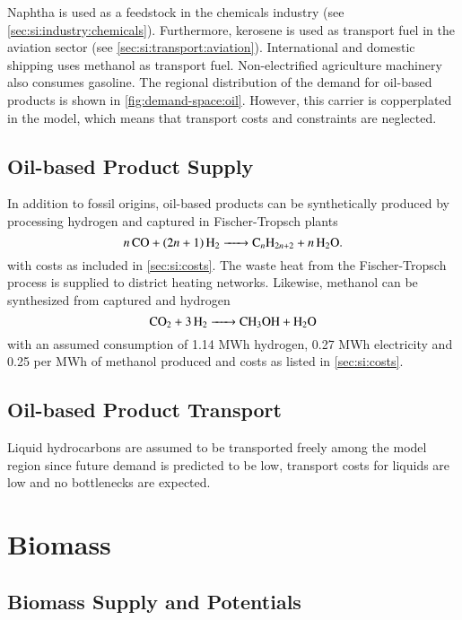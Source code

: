 Naphtha is used as a feedstock in the chemicals industry (see
\cref{sec:si:industry:chemicals}). Furthermore, kerosene is used as transport
fuel in the aviation sector (see \cref{sec:si:transport:aviation}). International
and domestic shipping uses methanol as transport fuel.
Non-electrified agriculture machinery also consumes gasoline. The regional
distribution of the demand for oil-based products is shown in
\cref{fig:demand-space:oil}. However, this carrier is copperplated in the model,
which means that transport costs and constraints are neglected.

\subsection{Oil-based Product Supply}
\label{sec:si:oil:supply}

In addition to fossil origins, oil-based products can be synthetically produced
by processing hydrogen and captured \co in Fischer-Tropsch plants
\begin{equation}
    \ce{$n$CO + ($2n$ + 1)H2 -> C_$n$H_{2n+2} + $n$H2O}.
\end{equation}
with costs as included in \cref{sec:si:costs}. The waste heat from the
Fischer-Tropsch process is supplied to district heating networks. Likewise,
methanol can be synthesized from captured \co and hydrogen
\begin{equation}
    \ce{CO2 + 3H2 -> CH3OH + H2O}
\end{equation}
with an assumed consumption of 1.14 MWh hydrogen, 0.27 MWh electricity and
\SI{0.25}{\tco} per MWh of methanol produced and costs as listed in
\cref{sec:si:costs}.

\subsection{Oil-based Product Transport}
\label{sec:si:oil:transport}

Liquid hydrocarbons are assumed to be transported freely among the model region
since future demand is predicted to be low, transport costs for liquids are low
and no bottlenecks are expected.

\section{Biomass}
\label{sec:si:bio}



\subsection{Biomass Supply and Potentials}
\label{sec:si:bio:potentials}

